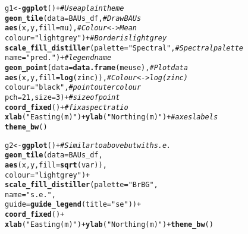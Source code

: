 \documentclass{article}\usepackage[]{graphicx}\usepackage[]{color}
\makeatletter
\newcommand{\hlnum}[1]{\textcolor[rgb]{0.686,0.059,0.569}{#1}}%
\newcommand{\hlstr}[1]{\textcolor[rgb]{0.192,0.494,0.8}{#1}}%
\newcommand{\hlcom}[1]{\textcolor[rgb]{0.678,0.584,0.686}{\textit{#1}}}%
\newcommand{\hlopt}[1]{\textcolor[rgb]{0,0,0}{#1}}%
\newcommand{\hlstd}[1]{\textcolor[rgb]{0.345,0.345,0.345}{#1}}%
\newcommand{\hlkwb}[1]{\textcolor[rgb]{0.69,0.353,0.396}{#1}}%
\newcommand{\hlkwc}[1]{\textcolor[rgb]{0.333,0.667,0.333}{#1}}%
\newcommand{\hlkwd}[1]{\textcolor[rgb]{0.737,0.353,0.396}{\textbf{#1}}}%
\newenvironment{kframe}{%
 \def\at@end@of@kframe{}%
 \ifinner\ifhmode%
  \def\at@end@of@kframe{\end{minipage}}%
  \begin{minipage}{\columnwidth}%
 \fi\fi%
 \def\FrameCommand##1{\hskip\@totalleftmargin \hskip-\fboxsep
 \colorbox{shadecolor}{##1}\hskip-\fboxsep
     \hskip-\linewidth \hskip-\@totalleftmargin \hskip\columnwidth}%
 \MakeFramed {\advance\hsize-\width
   \@totalleftmargin\z@ \linewidth\hsize
   \@setminipage}}%
 {\par\unskip\endMakeFramed%
 \at@end@of@kframe}
\newenvironment{knitrout}{}{} %
\makeatother
\begin{document}
\begin{knitrout}
\color{fgcolor}\begin{kframe}
\begin{alltt}
\hlstd{g1} \hlkwb{<-} \hlkwd{ggplot}\hlstd{()} \hlopt{+}                          \hlcom{# Use a plain theme}
    \hlkwd{geom_tile}\hlstd{(}\hlkwc{data}\hlstd{=BAUs_df ,}                  \hlcom{# Draw BAUs}
                 \hlkwd{aes}\hlstd{(x,y,}\hlkwc{fill}\hlstd{=mu),}      \hlcom{# Colour <-> Mean}
                 \hlkwc{colour}\hlstd{=}\hlstr{"light grey"}\hlstd{)} \hlopt{+}          \hlcom{# Border is light grey}
    \hlkwd{scale_fill_distiller}\hlstd{(}\hlkwc{palette}\hlstd{=}\hlstr{"Spectral"}\hlstd{,}     \hlcom{# Spectral palette}
                         \hlkwc{name}\hlstd{=}\hlstr{"pred."}\hlstd{)} \hlopt{+}         \hlcom{# legend name}
    \hlkwd{geom_point}\hlstd{(}\hlkwc{data}\hlstd{=}\hlkwd{data.frame}\hlstd{(meuse),}           \hlcom{# Plot data}
               \hlkwd{aes}\hlstd{(x,y,}\hlkwc{fill}\hlstd{=}\hlkwd{log}\hlstd{(zinc)),}          \hlcom{# Colour <-> log(zinc)}
               \hlkwc{colour}\hlstd{=}\hlstr{"black"}\hlstd{,}                   \hlcom{# point outer colour}
               \hlkwc{pch}\hlstd{=}\hlnum{21}\hlstd{,} \hlkwc{size}\hlstd{=}\hlnum{3}\hlstd{)} \hlopt{+}                 \hlcom{# size of point}
    \hlkwd{coord_fixed}\hlstd{()} \hlopt{+}                              \hlcom{# fix aspect ratio}
    \hlkwd{xlab}\hlstd{(}\hlstr{"Easting (m)"}\hlstd{)} \hlopt{+} \hlkwd{ylab}\hlstd{(}\hlstr{"Northing (m)"}\hlstd{)} \hlopt{+} \hlcom{# axes labels}
    \hlkwd{theme_bw}\hlstd{()}


\hlstd{g2} \hlkwb{<-} \hlkwd{ggplot}\hlstd{()} \hlopt{+}                          \hlcom{# Similar to above but with s.e.}
    \hlkwd{geom_tile}\hlstd{(}\hlkwc{data}\hlstd{=BAUs_df,}
                 \hlkwd{aes}\hlstd{(x,y,}\hlkwc{fill}\hlstd{=}\hlkwd{sqrt}\hlstd{(var)),}
                 \hlkwc{colour}\hlstd{=}\hlstr{"light grey"}\hlstd{)} \hlopt{+}
    \hlkwd{scale_fill_distiller}\hlstd{(}\hlkwc{palette}\hlstd{=}\hlstr{"BrBG"}\hlstd{,}
                         \hlkwc{name} \hlstd{=} \hlstr{"s.e."}\hlstd{,}
                         \hlkwc{guide} \hlstd{=} \hlkwd{guide_legend}\hlstd{(}\hlkwc{title}\hlstd{=}\hlstr{"se"}\hlstd{))} \hlopt{+}
    \hlkwd{coord_fixed}\hlstd{()} \hlopt{+}
    \hlkwd{xlab}\hlstd{(}\hlstr{"Easting (m)"}\hlstd{)} \hlopt{+} \hlkwd{ylab}\hlstd{(}\hlstr{"Northing (m)"}\hlstd{)} \hlopt{+} \hlkwd{theme_bw}\hlstd{()}
\end{alltt}
\end{kframe}
\end{knitrout}
\end{document}
